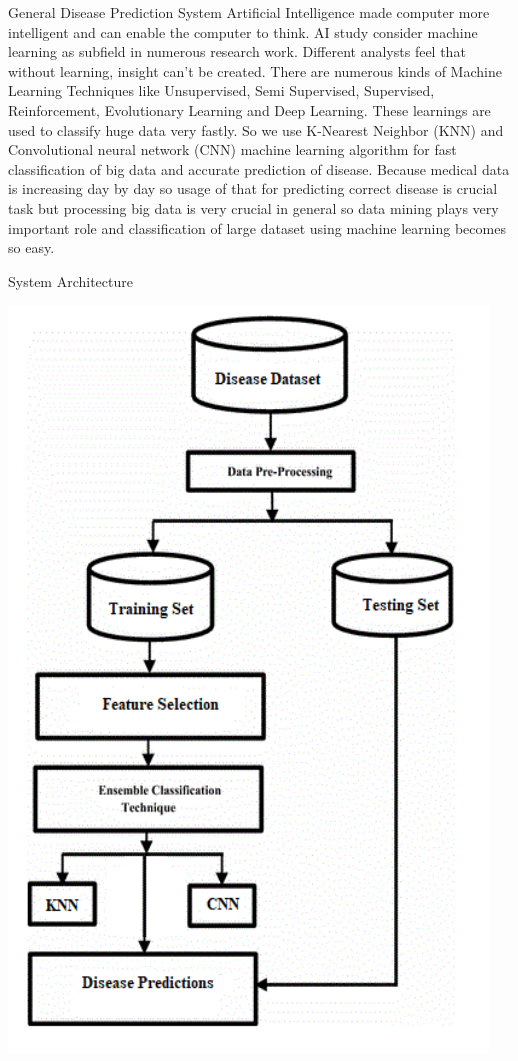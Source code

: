 \documentclass{SKP-beamer}
\begin{document}
\begin{frame}{General Disease Prediction System}
	Artificial Intelligence made computer more intelligent and can
	enable the computer to think. AI study consider machine
	learning as subfield in numerous research work. Different
	analysts feel that without learning, insight can't be created.
	There are numerous kinds of Machine Learning Techniques
	like Unsupervised, Semi Supervised, Supervised,
	Reinforcement, Evolutionary Learning and Deep Learning.
	These learnings are used to classify huge data very fastly. So
	we use K-Nearest Neighbor (KNN) and Convolutional neural
	network (CNN) machine learning algorithm for fast
	classification of big data and accurate prediction of disease.
	Because medical data is increasing day by day so usage of that
	for predicting correct disease is crucial task but processing big
	data is very crucial in general so data mining plays very
	important role and classification of large dataset using
	machine learning becomes so easy.
\end{frame}

\begin{frame}{System Architecture}
	\begin{center}
	\includegraphics[scale=0.48]{1.png}
\end{center}
\end{frame}
\end{document}
